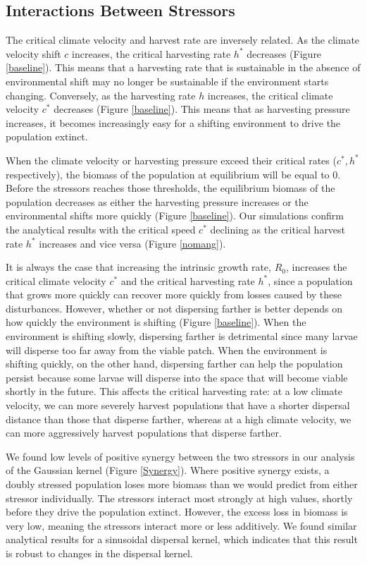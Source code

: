 \documentclass[12pt,english]{article}
\begin{document}
\begin{spacing}{1.9}
\begin{flushleft}
\subsection{Interactions Between Stressors }
The critical climate velocity and harvest  rate are inversely related.  As the climate velocity shift $c$ increases, the critical harvesting rate $h^*$ decreases (Figure  \ref{baseline}). This means that a harvesting rate that is sustainable in the absence of environmental shift may no longer be sustainable if the environment starts changing. Conversely, as the harvesting rate $h$ increases, the critical climate velocity $c^*$ decreases (Figure \ref{baseline}).  This means that as harvesting pressure increases, it becomes increasingly easy for a shifting environment to drive the population extinct.

When the climate velocity or harvesting pressure exceed their critical rates ($c^*, h^*$ respectively), the biomass of the population at equilibrium will be equal to $0$.  Before the stressors reaches those thresholds, the equilibrium biomass of the population decreases as either the harvesting pressure increases or the environmental shifts more quickly (Figure \ref{baseline}). Our simulations confirm the analytical results with the critical speed $c^*$ declining as the critical harvest rate $h^*$ increases and vice versa (Figure \ref{nomang}).

It is always the case that increasing the intrinsic growth rate, $R_0$, increases the critical climate velocity $c^*$ and the critical harvesting rate $h^*$, since a population that grows more quickly can recover more quickly from losses caused by these disturbances. However, whether or not dispersing farther is better depends on how quickly the environment is shifting (Figure \ref{baseline}). When the environment is shifting slowly, dispersing farther is detrimental since many larvae will disperse too far away from the viable patch. When the environment is shifting quickly, on the other hand, dispersing farther can help the population persist because some larvae will disperse into the space that will become viable shortly in the future.  This affects the critical harvesting rate: at a low climate velocity, we can more severely harvest populations that have a shorter dispersal distance than those that disperse farther, whereas at a high climate velocity, we can more aggressively harvest populations that disperse farther.

We found low levels of positive synergy between the two stressors in our analysis of the Gaussian kernel (Figure \ref{Synergy}).  Where positive synergy exists, a doubly stressed population loses more biomass than we would predict from either stressor individually.  The stressors interact most strongly at high values, shortly before they drive the population extinct.  However, the excess loss in biomass is very low, meaning the stressors interact more or less additively.  We found similar analytical results for a sinusoidal dispersal kernel, which indicates that this result is robust to changes in the dispersal kernel.  


\end{flushleft}
\end{spacing}
\end{document}
